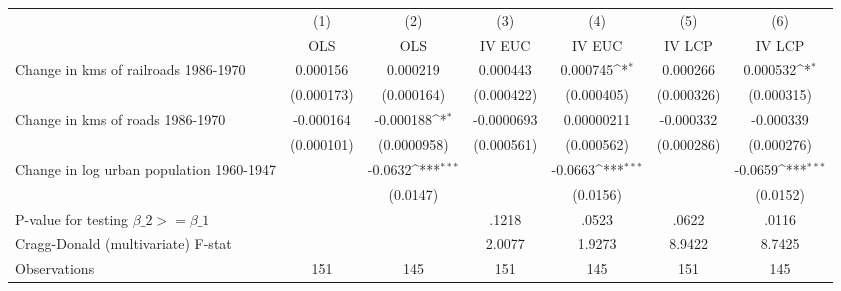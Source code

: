 {
\def\sym#1{\ifmmode^{#1}\else\(^{#1}\)\fi}
\begin{tabular}{l*{6}{c}}
\hline\hline
                &\multicolumn{1}{c}{(1)}&\multicolumn{1}{c}{(2)}&\multicolumn{1}{c}{(3)}&\multicolumn{1}{c}{(4)}&\multicolumn{1}{c}{(5)}&\multicolumn{1}{c}{(6)}\\
                &\multicolumn{1}{c}{OLS}&\multicolumn{1}{c}{OLS}&\multicolumn{1}{c}{IV EUC}&\multicolumn{1}{c}{IV EUC}&\multicolumn{1}{c}{IV LCP}&\multicolumn{1}{c}{IV LCP}\\
\hline
Change in kms of railroads 1986-1970& 0.000156         & 0.000219         & 0.000443         & 0.000745\sym{*}  & 0.000266         & 0.000532\sym{*}  \\
                &(0.000173)         &(0.000164)         &(0.000422)         &(0.000405)         &(0.000326)         &(0.000315)         \\
[1em]
Change in kms of roads 1986-1970&-0.000164         &-0.000188\sym{*}  &-0.0000693         &0.00000211         &-0.000332         &-0.000339         \\
                &(0.000101)         &(0.0000958)         &(0.000561)         &(0.000562)         &(0.000286)         &(0.000276)         \\
[1em]
Change in log urban population 1960-1947&                  &  -0.0632\sym{***}&                  &  -0.0663\sym{***}&                  &  -0.0659\sym{***}\\
                &                  & (0.0147)         &                  & (0.0156)         &                  & (0.0152)         \\
\hline
P-value for testing $\beta\_{2} >= \beta\_{1}$&                  &                  &    .1218         &    .0523         &    .0622         &    .0116         \\
Cragg-Donald (multivariate) F-stat&                  &                  &   2.0077         &   1.9273         &   8.9422         &   8.7425         \\
Observations    &      151         &      145         &      151         &      145         &      151         &      145         \\
\hline\hline
\end{tabular}
}
